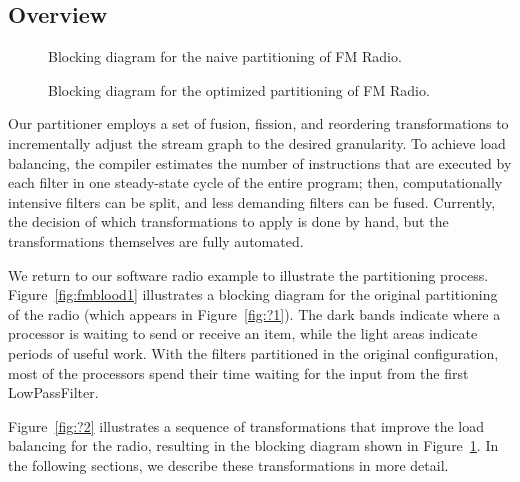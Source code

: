 \subsection{Overview}

\begin{figure}[t]
\vspace{-6pt}
\begin{minipage}{3.1in}
\vspace{-12pt}
\caption{\protect\small Blocking diagram for the naive partitioning of
 FM Radio.
\protect\label{fig:fmblood1}}
\end{minipage}
\hspace{0.3in}
\vspace{-12pt}
\begin{minipage}{3.1in}
\caption{\protect\small Blocking diagram for the optimized
partitioning of FM Radio.
\protect\label{fig:fmblood2}}
\end{minipage}
\vspace{-6pt}
\end{figure}

Our partitioner employs a set of fusion, fission, and reordering
transformations to incrementally adjust the stream graph to the
desired granularity.  To achieve load balancing, the compiler
estimates the number of instructions that are executed by each filter
in one steady-state cycle of the entire program; then, computationally
intensive filters can be split, and less demanding filters can be
fused.  Currently, the decision of which transformations to apply is
done by hand, but the transformations themselves are fully automated.

We return to our software radio example to illustrate the partitioning
process.  Figure~\ref{fig:fmblood1} illustrates a blocking diagram for
the original partitioning of the radio (which appears in
Figure~\ref{fig:?1}).  The dark bands indicate where a processor is
waiting to send or receive an item, while the light areas indicate
periods of useful work.  With the filters partitioned in the original
configuration, most of the processors spend their time waiting for the
input from the first LowPassFilter.

Figure~\ref{fig:?2} illustrates a sequence of transformations that
improve the load balancing for the radio, resulting in the blocking
diagram shown in Figure~\ref{fig:fmblood2}.   In the following sections, we describe these
transformations in more detail.

